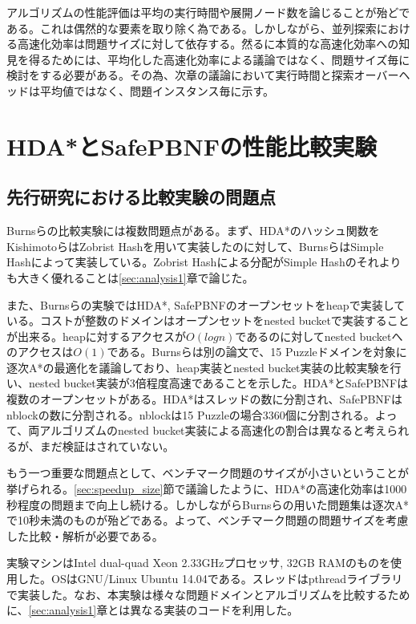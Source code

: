 \documentclass[uplatex]{jsarticle}
\begin{document}
アルゴリズムの性能評価は平均の実行時間や展開ノード数を論じることが殆どである。これは偶然的な要素を取り除く為である。しかしながら、並列探索における高速化効率は問題サイズに対して依存する。然るに本質的な高速化効率への知見を得るためには、平均化した高速化効率による議論ではなく、問題サイズ毎に検討をする必要がある。その為、次章の議論において実行時間と探索オーバーヘッドは平均値ではなく、問題インスタンス毎に示す。

\newpage

\section{HDA*とSafePBNFの性能比較実験}
\label{sec:analysis2}

\subsection{先行研究における比較実験の問題点}

Burnsらの比較実験には複数問題点がある\cite{Burns2010}。まず、HDA*のハッシュ関数をKishimotoらはZobrist Hashを用いて実装したのに対して、BurnsらはSimple Hashによって実装している。Zobrist Hashによる分配がSimple Hashのそれよりも大きく優れることは\ref{sec:analysis1}章で論じた。

また、Burnsらの実験ではHDA*, SafePBNFのオープンセットをheapで実装している。コストが整数のドメインはオープンセットをnested bucketで実装することが出来る。heapに対するアクセスが$O(logn)$であるのに対してnested bucketへのアクセスは$O(1)$である。Burnsらは別の論文で、15 Puzzleドメインを対象に逐次A*の最適化を議論しており、heap実装とnested bucket実装の比較実験を行い、nested bucket実装が3倍程度高速であることを示した\cite{Burns2012implementing}。HDA*とSafePBNFは複数のオープンセットがある。HDA*はスレッドの数に分割され、SafePBNFはnblockの数に分割される。nblockは15 Puzzleの場合3360個に分割される。よって、両アルゴリズムのnested bucket実装による高速化の割合は異なると考えられるが、まだ検証はされていない。

もう一つ重要な問題点として、ベンチマーク問題のサイズが小さいということが挙げられる。\ref{sec:speedup_size}節で議論したように、HDA*の高速化効率は1000秒程度の問題まで向上し続ける。しかしながらBurnsらの用いた問題集は逐次A*で10秒未満のものが殆どである。よって、ベンチマーク問題の問題サイズを考慮した比較・解析が必要である。

実験マシンはIntel dual-quad Xeon 2.33GHzプロセッサ, 32GB RAMのものを使用した。OSはGNU/Linux Ubuntu 14.04である。スレッドはpthreadライブラリで実装した。なお、本実験は様々な問題ドメインとアルゴリズムを比較するために、\ref{sec:analysis1}章とは異なる実装のコードを利用した。
\end{document}
